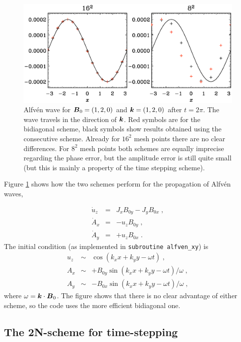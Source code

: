\documentclass[\mydriver,12pt,twoside,notitlepage,a4paper]{article}
\renewcommand{\vec}[1]{\mbox{\boldmath{$#1$}}}
\newcommand{\Bv}            {\vec{B}}
\newcommand{\kv}            {\vec{k}}
\begin{document}
\begin{figure}[h]
  \centering
  \includegraphics[width=\columnwidth]{pcompbidiagonal}
  \caption{
    Alfv\'en wave for $\Bv_0=(1,2,0)$ and $\kv=(1,2,0)$ after $t=2\pi$.
    The wave travels in the direction of $\kv$.
    Red symbols are for the bidiagonal scheme, black symbols show results
    obtained using the consecutive scheme.
    Already for $16^2$ mesh points there are no clear differences.
    For $8^2$ mesh points both schemes are equally imprecise regarding
    the phase error, but the amplitude error is still quite small
    (but this is mainly a property of the time stepping scheme).
  }
  \label{Fig-pcompbidiagonal}
\end{figure}

Figure \ref{Fig-pcompbidiagonal} shows how the two schemes perform for the
propagation of Alfv\'en waves,

\begin{eqnarray}
  \dot{u}_z &=& J_xB_{0y}-J_yB_{0x} \; , \\
  \dot{A}_x &=& -u_zB_{0y} \; , \\
  \dot{A}_y &=& +u_zB_{0x} \; .
\end{eqnarray}
The initial condition (as implemented in \texttt{subroutine alfven\_xy})
is
\begin{eqnarray}
  u_z &\sim& \cos(k_xx+k_yy-\omega t) \; , \\
  A_x &\sim& +B_{0y}\sin(k_xx+k_yy-\omega t)/\omega \; , \\
  A_y &\sim& -B_{0x}\sin(k_xx+k_yy-\omega t)/\omega \; ,
\end{eqnarray}
where $\omega=\kv\cdot\Bv_0$.
The figure shows that there is no clear advantage of either scheme, so the
code uses the more efficient bidiagonal one.

\subsection{The 2N-scheme for time-stepping}
\label{S-2N-scheme}
\end{document}
